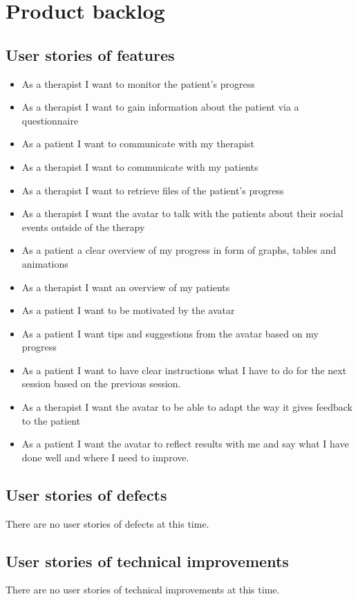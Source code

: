 \chapter{Product backlog}

\section{User stories of features}
\begin{itemize}
\item As a therapist I want to monitor the patient’s progress
\item As a therapist I want to gain information about the patient via a questionnaire
\item As a patient I want to communicate with my therapist
\item As a therapist I want to communicate with my patients
\item As a therapist I want to retrieve files of the patient’s progress
\item As a therapist I want the avatar to talk with the patients about their social events outside of the therapy
\item As a patient a clear overview of my progress in form of graphs, tables and animations
\item As a therapist I want an overview of my patients 
\item As a patient I want to be motivated by the avatar
\item As a patient I want tips and suggestions from the avatar based on my progress
\item As a patient I want to have clear instructions what I have to do for the next session based on the previous session.
\item As a therapist I want the avatar to be able to adapt the way it gives feedback to the patient
\item As a patient I want the avatar to reflect results with me and say what I have done well and where I need to improve.
\end{itemize}
 
\section{User stories of defects}
There are no user stories of defects at this time.

\section{User stories of technical improvements}
There are no user stories of technical improvements at this time.


